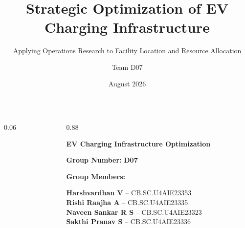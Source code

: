 \documentclass[aspectratio=169,10pt]{beamer}
\title{Strategic Optimization of EV Charging Infrastructure}
\subtitle{Applying Operations Research to Facility Location and Resource Allocation}
\author{Team D07}
\institute{Amrita School of Artificial Intelligence\\Amrita Vishwa Vidyapeetham, Coimbatore}
\date{August 2026}
\begin{document}
\begin{frame}[plain]

\vspace{0.65cm}

\begin{columns}[c]

\begin{column}{0.06\textwidth}
\end{column}

\begin{column}{0.88\textwidth}

{\fontsize{24}{29}\selectfont
\color{Navy}
\textbf{EV Charging Infrastructure Optimization}}\\[-1mm]

\vspace{0.55cm}

{\large
\textbf{Group Number:} \color{Teal}\textbf{D07}
}

\vspace{0.35cm}

{\large
\color{Navy}
\textbf{Group Members:}
}

\vspace{0.18cm}

{\normalsize
\textbf{Harshvardhan V} -- CB.SC.U4AIE23353\\[1.5mm]
\textbf{Rishi Raajha A} -- CB.SC.U4AIE23335\\[1.5mm]
\textbf{Naveen Sankar R S} -- CB.SC.U4AIE23323\\[1.5mm]
\textbf{Sakthi Pranav S} -- CB.SC.U4AIE23336
}

\end{column}

\end{columns}

\end{frame}
\end{document}
